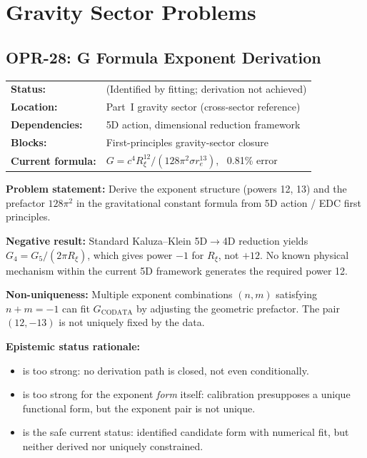 \section{Gravity Sector Problems}

\subsection*{OPR-28: G Formula Exponent Derivation}
\begin{tabular}{ll}
\textbf{Status:} & \tagI{} (Identified by fitting; derivation not achieved) \\
\textbf{Location:} & Part~I gravity sector (cross-sector reference) \\
\textbf{Dependencies:} & 5D action, dimensional reduction framework \\
\textbf{Blocks:} & First-principles gravity-sector closure \\
\textbf{Current formula:} & $G = c^4 R_\xi^{12}/(128\pi^2 \sigma r_e^{13})$, ~0.81\% error \\
\end{tabular}

\textbf{Problem statement:} Derive the exponent structure (powers 12, 13)
and the prefactor $128\pi^2$ in the gravitational constant formula from
5D action / EDC first principles.

\textbf{Negative result:} Standard Kaluza--Klein 5D$\to$4D reduction yields
$G_4 = G_5/(2\pi R_\xi)$, which gives power $-1$ for $R_\xi$, not $+12$.
No known physical mechanism within the current 5D framework generates the
required power 12.

\textbf{Non-uniqueness:} Multiple exponent combinations $(n, m)$ satisfying
$n + m = -1$ can fit $G_{\mathrm{CODATA}}$ by adjusting the geometric prefactor.
The pair $(12, -13)$ is not uniquely fixed by the data.

\textbf{Epistemic status rationale:}
\begin{itemize}[nosep]
\item \tagDc{} is too strong: no derivation path is closed, not even conditionally.
\item \tagCal{} is too strong for the exponent \emph{form} itself: calibration
  presupposes a unique functional form, but the exponent pair is not unique.
\item \tagI{} is the safe current status: identified candidate form with
  numerical fit, but neither derived nor uniquely constrained.
\end{itemize}

